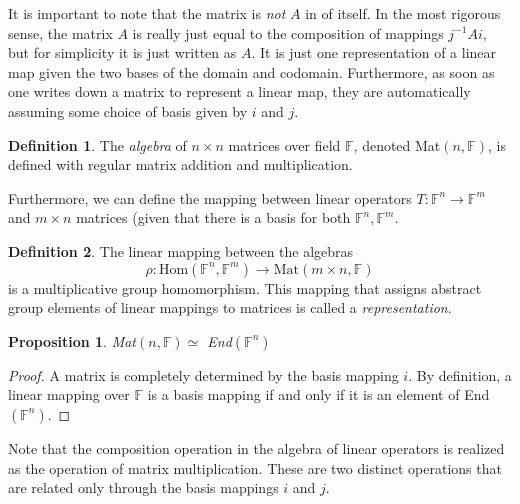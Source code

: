 \documentclass{article}
\newtheorem{proposition}[theorem]{Proposition}
\theoremstyle{remark}
\theoremstyle{definition}
\newtheorem{definition}{Definition}[section]
\begin{document}
It is important to note that the matrix is \textit{not} $A$ in of itself. In the most rigorous sense, the matrix $A$ is really just equal to the composition of mappings $ j^{-1} A i$, but for simplicity it is just written as $A$. It is just one representation of a linear map given the two bases of the domain and codomain. Furthermore, as soon as one writes down a matrix to represent a linear map, they are automatically assuming some choice of basis given by $i$ and $j$. 

\begin{definition}
The \textit{algebra} of $n \times n$ matrices over field $\mathbb{F}$, denoted Mat$(n, \mathbb{F})$, is defined with regular matrix addition and multiplication. 
\end{definition}

Furthermore, we can define the mapping between linear operators $T: \mathbb{F}^n \longrightarrow \mathbb{F}^m$ and $m \times n$ matrices (given that there is a basis for both $\mathbb{F}^n, \mathbb{F}^m$. 

\begin{definition}
The linear mapping between the algebras 
\[\rho: \text{Hom}(\mathbb{F}^n, \mathbb{F}^m) \longrightarrow \text{Mat}(m \times n, \mathbb{F})\]
is a multiplicative group homomorphism. This mapping that assigns abstract group elements of linear mappings to matrices is called a \textit{representation}. 
\end{definition}

\begin{proposition}
Mat$(n, \mathbb{F}) \simeq $ End$(\mathbb{F}^n)$ 
\end{proposition}
\begin{proof}
A matrix is completely determined by the basis mapping $i$. By definition, a linear mapping over $\mathbb{F}$ is a basis mapping if and only if it is an element of End$(\mathbb{F}^n)$. 
\end{proof}

Note that the composition operation in the algebra of linear operators is realized as the operation of matrix multiplication. These are two distinct operations that are related only through the basis mappings $i$ and $j$. 
\end{document}
